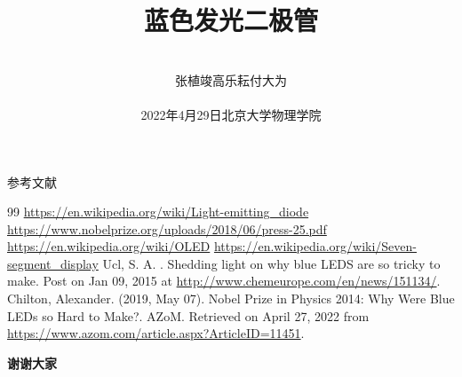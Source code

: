 \documentclass{beamer}
\title{#1}
\title{蓝色发光二极管}
\date{
    \kaishu
    \vspace{-1em} \\
    张植竣\quad 高乐耘\quad 付大为 \\~\\
    2022年4月29日\quad 北京大学物理学院 \\
}
\newcommand{\<}{\left<}
\newcommand{\>}{\right>}
\begin{document}
\addtocounter{framenumber}{-1}
\begin{frame}[plain]
    \titlepage
\end{frame}

\date{}

{}
{}
{}

\addtocounter{framenumber}{-1}
\begin{frame}[plain]{参考文献}
\begin{thebibliography}{99}\setlength{\itemsep}{0pt}\small
     \url{https://en.wikipedia.org/wiki/Light-emitting_diode}
    \url{https://www.nobelprize.org/uploads/2018/06/press-25.pdf}
    \url{https://en.wikipedia.org/wiki/OLED}
    \url{https://en.wikipedia.org/wiki/Seven-segment_display}
     Ucl, S. A. . Shedding light on why blue LEDS are so tricky to make. Post on Jan 09, 2015 at \url{http://www.chemeurope.com/en/news/151134/}.
     Chilton, Alexander. (2019, May 07). Nobel Prize in Physics 2014: Why Were Blue LEDs so Hard to Make?. AZoM. Retrieved on April 27, 2022 from \url{https://www.azom.com/article.aspx?ArticleID=11451}.
\end{thebibliography}
\end{frame}

\addtocounter{framenumber}{-1}
\begin{frame}[plain]
    \begin{center}
      \Huge\textbf{谢谢大家}
    \end{center}
\end{frame}
\end{document}
